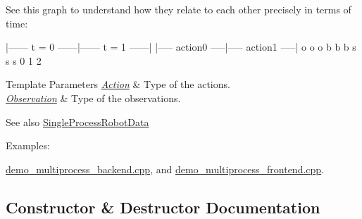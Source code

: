 See this graph to understand how they relate to each other precisely in terms of time\+:

\begin{DoxyVerb}|------ t = 0 ------|------ t = 1 ------|
|----- action0 -----|----- action1 -----|
o                   o                   o
b                   b                   b
s                   s                   s
0                   1                   2
\end{DoxyVerb}



\begin{DoxyTemplParams}{Template Parameters}
{\em \hyperlink{classAction}{Action}} & Type of the actions. \\
\hline
{\em \hyperlink{classObservation}{Observation}} & Type of the observations. \\
\hline
\end{DoxyTemplParams}
\begin{DoxySeeAlso}{See also}
\hyperlink{classrobot__interfaces_1_1SingleProcessRobotData}{Single\+Process\+Robot\+Data} 
\end{DoxySeeAlso}
\begin{Desc}
\item[Examples\+: ]\par
\hyperlink{demo_multiprocess_backend_8cpp-example}{demo\+\_\+multiprocess\+\_\+backend.\+cpp}, and \hyperlink{demo_multiprocess_frontend_8cpp-example}{demo\+\_\+multiprocess\+\_\+frontend.\+cpp}.\end{Desc}


\subsection{Constructor \& Destructor Documentation}
